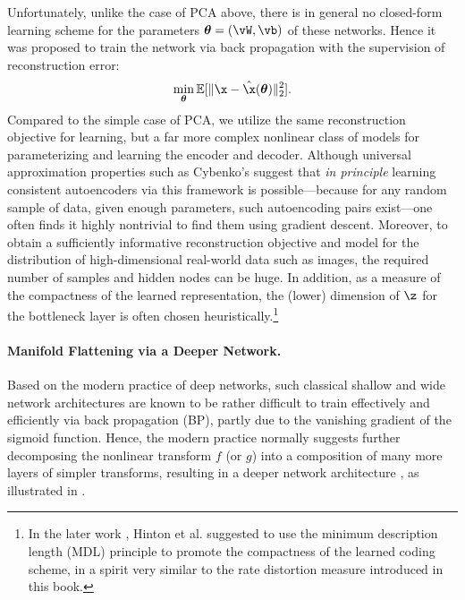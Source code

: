 \documentclass[../../book-main.tex]{subfiles}
\begin{document}
Unfortunately, unlike the case of PCA above, there is in general no
closed-form learning scheme for the parameters $\boldsymbol{\theta} =
(\vW, \vb)$ of these networks. Hence it was proposed to train the
network via back propagation with the supervision of reconstruction error:
\begin{equation}\label{eq:nonlinear-pca-ch5}
  \min_{\boldsymbol{\theta}} \mathbb{E}[ \|\x - \hat{\x}(\boldsymbol{\theta})\|_2^2].
\end{equation}
Compared to the simple case of PCA, we utilize the same reconstruction objective
for learning, but a far more complex nonlinear class of models for
parameterizing and learning the encoder and decoder. Although universal
approximation properties such as Cybenko's suggest that \textit{in principle}
learning consistent autoencoders via this framework is possible---because for
any random sample of data, given enough parameters, such autoencoding pairs
exist---one often finds it highly nontrivial to find them using gradient descent.
Moreover, to obtain a sufficiently informative reconstruction objective
and model for the
distribution of high-dimensional real-world data such as images, the required
number of samples and hidden nodes can be huge.
In addition, as a measure of the compactness of the learned representation, the
(lower) dimension of $\z$ for the bottleneck layer is often chosen
heuristically.\footnote{In the later work \cite{Hinton-1993}, Hinton et al. suggested to use the minimum description length (MDL) principle to promote
  the compactness of the learned coding scheme, in a spirit very similar to the
rate distortion measure introduced in this book.}

\paragraph{Manifold Flattening via a Deeper Network.}
Based on the modern practice of deep networks, such classical shallow
and wide network architectures are known to be rather difficult to
train effectively and efficiently via back propagation (BP), partly
due to the vanishing gradient of the sigmoid function. Hence, the
modern practice normally suggests further
decomposing the nonlinear transform $f$ (or $g$) into a composition of
many more layers of simpler transforms, resulting in a deeper network architecture
\cite{Hinton504}, as illustrated in .
\end{document}
